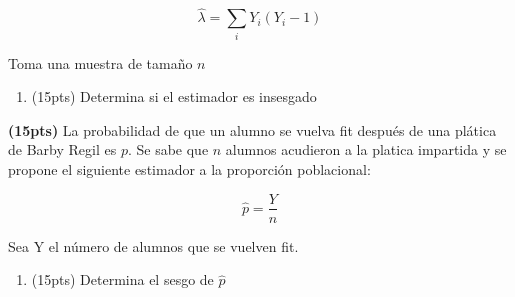 \documentclass[addpoints]{exam}
\theoremstyle{mytheor}
\begin{document}
\begin{questions}
$$\hat{\lambda} = \sum_i Y_i(Y_i-1) $$

Toma una muestra de tamaño $n$

\begin{enumerate}[label=\Alph*)]
\item (15pts) Determina si el estimador es insesgado
\end{enumerate}


\question \textbf{(15pts)} La probabilidad de que un alumno se vuelva fit después de una plática de Barby Regil es $p$. Se sabe que $n$ alumnos acudieron a la platica impartida y se propone el siguiente estimador a la proporción poblacional:

$$\hat{p} = \frac{Y}{n}$$

Sea Y el número de alumnos que se vuelven fit. 

\begin{enumerate}[label=\Alph*)]
\item (15pts) Determina el sesgo de $\hat{p}$
\end{enumerate}


  \end{questions}
  
\end{document}
